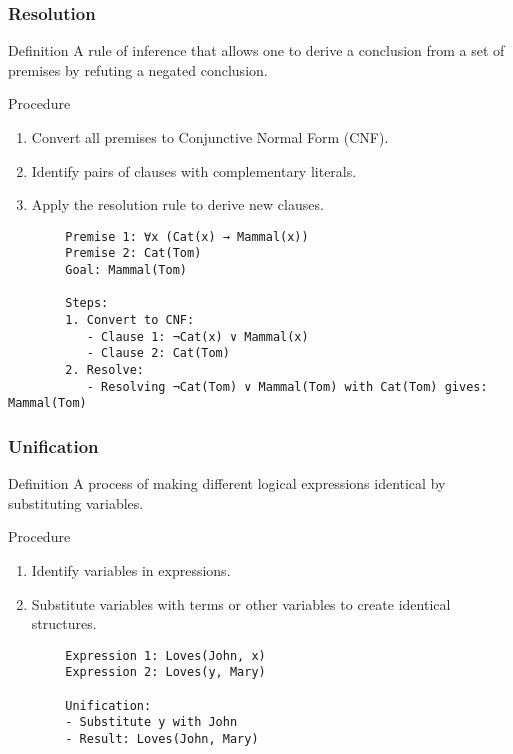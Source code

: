 \documentclass[aspectratio=169]{beamer}
\begin{document}
\begin{frame}[fragile]
    \frametitle{Resolution}
    \begin{block}{Definition}
        A rule of inference that allows one to derive a conclusion from a set of premises by refuting a negated conclusion.
    \end{block}
    \begin{block}{Procedure}
        \begin{enumerate}
            \item Convert all premises to Conjunctive Normal Form (CNF).
            \item Identify pairs of clauses with complementary literals.
            \item Apply the resolution rule to derive new clauses.
        \end{enumerate}
    \end{block}
    \begin{example}
        \begin{lstlisting}
        Premise 1: ∀x (Cat(x) → Mammal(x))
        Premise 2: Cat(Tom)
        Goal: Mammal(Tom)

        Steps:
        1. Convert to CNF:
           - Clause 1: ¬Cat(x) ∨ Mammal(x)
           - Clause 2: Cat(Tom)
        2. Resolve:
           - Resolving ¬Cat(Tom) ∨ Mammal(Tom) with Cat(Tom) gives: Mammal(Tom)
        \end{lstlisting}
    \end{example}
\end{frame}

\begin{frame}[fragile]
    \frametitle{Unification}
    \begin{block}{Definition}
        A process of making different logical expressions identical by substituting variables.
    \end{block}
    \begin{block}{Procedure}
        \begin{enumerate}
            \item Identify variables in expressions.
            \item Substitute variables with terms or other variables to create identical structures.
        \end{enumerate}
    \end{block}
    \begin{example}
        \begin{lstlisting}
        Expression 1: Loves(John, x)
        Expression 2: Loves(y, Mary)

        Unification:
        - Substitute y with John
        - Result: Loves(John, Mary)
        \end{lstlisting}
    \end{example}
\end{frame}
\end{document}
